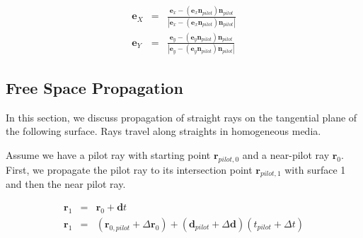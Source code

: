 \documentclass[12pt,a4paper,twoside,openright,BCOR10mm,headsepline,titlepage,abstracton,chapterprefix,final]{scrreprt}
\newcommand\Vector[1]{{\mathbf{#1}}}
\begin{document}
\begin{eqnarray}
 \Vector{e}_{X} &=& \frac{\Vector{e}_{x} - (\Vector{e}_{x}\Vector{n}_{pilot})\Vector{n}_{pilot}}{|\Vector{e}_{x} - (\Vector{e}_{x}\Vector{n}_{pilot})\Vector{n}_{pilot}|}
 \\[2ex]
 \Vector{e}_{Y} &=& \frac{\Vector{e}_{y} - (\Vector{e}_{y}\Vector{n}_{pilot})\Vector{n}_{pilot}}{|\Vector{e}_{y} - (\Vector{e}_{y}\Vector{n}_{pilot})\Vector{n}_{pilot}|}
\end{eqnarray}



\subsection{Free Space Propagation}
In this section, we discuss propagation of straight rays on the tangential plane of the following surface.
Rays travel along straights in homogeneous media.

Assume we have a pilot ray with starting point $\Vector{r}_{pilot,0}$ and a near-pilot ray ${\Vector{r}_0}$.
First, we propagate the pilot ray to its intersection point $\Vector{r}_{pilot,1}$ with surface 1 and then the near pilot ray.

\begin{eqnarray}
 \Vector{r}_1 &=& \Vector{r}_0 + \Vector{d} t \\
 \Vector{r}_1 &=& (\Vector{r}_{0,pilot} + \Delta\Vector{r}_0) + (\Vector{d}_{pilot} + \Delta\Vector{d}) (t_{pilot} + \Delta t) \\ 
\end{eqnarray} 
\end{document}
